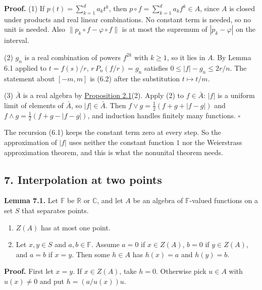 \documentclass[
  english,
  11pt,
  a4paper,
]{article}
\providecommand{\tightlist}{%
  \setlength{\itemsep}{0pt}\setlength{\parskip}{0pt}}
\begin{document}
\textbf{Proof.} (1) If \(p(t)=\sum_{k=1}^da_kt^k\), then
\(p\circ f=\sum_{k=1}^da_kf^k\in A\), since \(A\) is closed under
products and real linear combinations. No constant term is needed, so no
unit is needed. Also \(\|p_k\circ f-\varphi\circ f\|\) is at most the
supremum of \(|p_k-\varphi|\) on the interval.

(2) \(g_n\) is a real combination of powers \(f^{2k}\) with \(k\geq1\),
so it lies in \(A\). By Lemma 6.1 applied to \(t=f(s)/r\),
\(r\,P_n(f/r)=g_n\) satisfies \(0\leq|f|-g_n\leq2r/n\). The statement
about \([-m,m]\) is (6.2) after the substitution \(t\mapsto t/m\).

(3) \(\bar A\) is a real algebra by
\hyperlink{the-stone-weierstrass-theorem-for-functions-vanishing-at-infinity--oa-fnd-sw-01}{Proposition
2.1}(2). Apply (2) to \(f\in\bar A\): \(|f|\) is a uniform limit of
elements of \(\bar A\), so \(|f|\in\bar A\). Then
\(f\vee g=\frac12(f+g+|f-g|)\) and \(f\wedge g=\frac12(f+g-|f-g|)\), and
induction handles finitely many functions. \(\square\)

The recursion (6.1) keeps the constant term zero at every step. So the
approximation of \(|f|\) uses neither the constant function \(1\) nor
the Weierstrass approximation theorem, and this is what the nonunital
theorem needs.

\subsection[7. Interpolation at two
points]{\texorpdfstring{\protect\hypertarget{the-stone-weierstrass-theorem-for-functions-vanishing-at-infinity--oa-fnd-sw-05}{}{}7.
Interpolation at two
points}{7. Interpolation at two points}}\label{the-stone-weierstrass-theorem-for-functions-vanishing-at-infinity--OA-FND-SW-05}

\textbf{Lemma 7.1.} Let \(\mathbb F\) be \(\mathbb R\) or \(\mathbb C\),
and let \(A\) be an algebra of \(\mathbb F\)-valued functions on a set
\(S\) that separates points.

\begin{enumerate}
\tightlist
\item
  \(Z(A)\) has at most one point.
\item
  Let \(x,y\in S\) and \(a,b\in\mathbb F\). Assume \(a=0\) if
  \(x\in Z(A)\), \(b=0\) if \(y\in Z(A)\), and \(a=b\) if \(x=y\). Then
  some \(h\in A\) has \(h(x)=a\) and \(h(y)=b\).
\end{enumerate}

\textbf{Proof.} First let \(x=y\). If \(x\in Z(A)\), take \(h=0\).
Otherwise pick \(u\in A\) with \(u(x)\neq0\) and put \(h=(a/u(x))u\).
\end{document}
